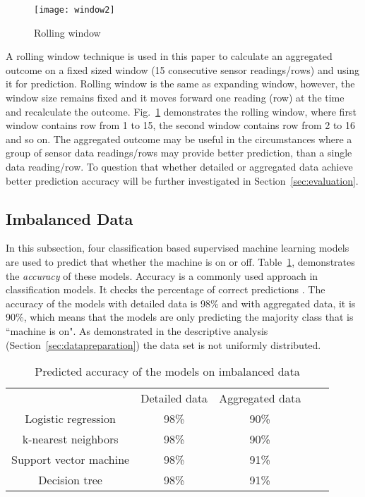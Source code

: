 \documentclass[runningheads]{llncs}
\begin{document}
\begin{figure}
\centering
\texttt{[image: window2]} 
\caption{Rolling window}
\label{fig:window}
\end{figure}

A rolling window technique is used in this paper to calculate an aggregated outcome on a fixed sized window (15 consecutive sensor readings/rows) and using it for prediction. Rolling window is the same as expanding window, however, the window size remains fixed and it moves forward one reading (row) at the time and recalculate the outcome. Fig.~\ref{fig:window} demonstrates the rolling window, where first window contains row from 1 to 15, the second window contains row from 2 to 16 and so on. The aggregated outcome may be useful in the circumstances where a group of sensor data readings/rows may provide better prediction, than a single data reading/row. To question that whether detailed or aggregated data achieve better prediction accuracy will be further investigated in Section~\ref{sec:evaluation}.




\subsection {Imbalanced Data}
\label{sec:imbalanced}
In this subsection, four classification based supervised machine learning models are used to predict that whether the machine is on or off. Table~\ref{example4}, demonstrates the \emph{accuracy} of these models. Accuracy is a commonly used approach in classification models. It checks the percentage of correct predictions \cite{book}. The accuracy of the models with detailed data is 98\% and with aggregated data, it is 90\%, which means that the models are only predicting the majority class that is ``machine is on". As demonstrated in the descriptive analysis (Section~\ref{sec:datapreparation}) the data set is not uniformly distributed. 

\begin{table}[ht]
\caption{Predicted accuracy of the models on imbalanced data}
\label{example4}
\centering
\begin{tabular}{ccccc}
\hline\noalign{\smallskip}
 & Detailed data & Aggregated data \\

\noalign{\smallskip}
\hline
\noalign{\smallskip}
Logistic regression     &        98\% &90\%  \\
k-nearest neighbors    &         98\% & 90\% \\
Support vector machine         &        98\% & 91\%   \\
Decision tree &        98\% & 91\%   \\
\hline
\end{tabular}
\end{table}
\end{document}
